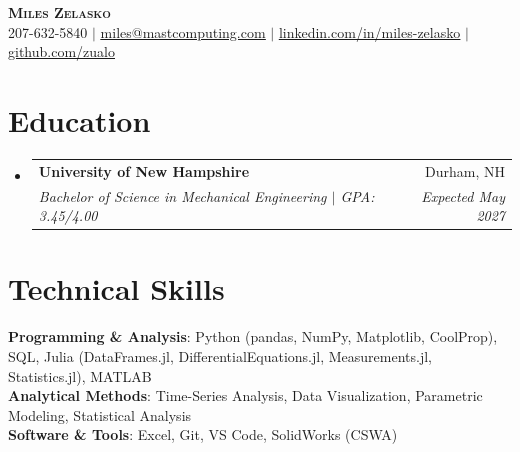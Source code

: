 \documentclass[letterpaper,11pt]{article}
\makeatletter
\newcommand{\resumeSubheading}[4]{
  \vspace{-2pt}\item
    \begin{tabular*}{0.97\textwidth}[t]{l@{\extracolsep{\fill}}r}
      \textbf{#1} & #2 \\
      \textit{\small#3} & \textit{\small #4} \\
    \end{tabular*}\vspace{-7pt}
}
\newcommand{\resumeSubHeadingListStart}{\begin{itemize}[leftmargin=0.15in, label={}]}
\newcommand{\resumeSubHeadingListEnd}{\end{itemize}}
\makeatother
\begin{document}
\begin{center}
    \textbf{\Huge \scshape Miles Zelasko} \\ \vspace{1pt}
    \small 207-632-5840 $|$ \href{mailto:miles@mastcomputing.com}{\underline{miles@mastcomputing.com}} $|$ 
    \href{https://linkedin.com/in/miles-zelasko}{\underline{linkedin.com/in/miles-zelasko}} $|$
    \href{https://github.com/zualo}{\underline{github.com/zualo}}
\end{center}

\section{Education}
  \resumeSubHeadingListStart
    \resumeSubheading
      {University of New Hampshire}{Durham, NH}
      {Bachelor of Science in Mechanical Engineering $|$ GPA: 3.45/4.00}{Expected May 2027}
  \resumeSubHeadingListEnd

\section{Technical Skills}
 \begin{itemize}[leftmargin=0.15in, label={}]
    \small{\item{
     \textbf{Programming \& Analysis}{: Python (pandas, NumPy, Matplotlib, CoolProp), SQL, Julia (DataFrames.jl, DifferentialEquations.jl, Measurements.jl, Statistics.jl), MATLAB} \\
     \textbf{Analytical Methods}{: Time-Series Analysis, Data Visualization, Parametric Modeling, Statistical Analysis} \\
     \textbf{Software \& Tools}{: Excel, Git, VS Code, SolidWorks (CSWA)}
    }}
 \end{itemize}

\end{document}
